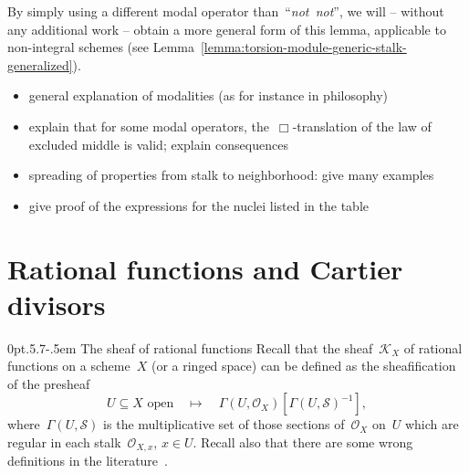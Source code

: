 \documentclass[10pt,reqno,a4paper]{amsbook}
\makeatletter
\theoremstyle{definition}
\theoremstyle{plain}
\theoremstyle{remark}
\renewcommand{\O}{\mathcal{O}}
\newcommand{\K}{\mathcal{K}}
\renewcommand{\S}{\mathcal{S}}
\newcommand{\?}{\,{:}\,}
\renewcommand{\_}{\mathpunct{.}\,}
\newcommand{\notnot}{\emph{not~not}\xspace}
\def\subsection{\@startsection{subsection}{2}%
  {0pt}{.5\linespacing\@plus.7\linespacing}{-.5em}%
  {\normalfont\bfseries}}
\makeatother
\begin{document}
By simply using a different modal operator than~``\notnot'', we will -- without
any additional work -- obtain a more general form of this lemma, applicable to
non-integral schemes (see Lemma~\ref{lemma:torsion-module-generic-stalk-generalized}).

\begin{itemize}
\item general explanation of modalities (as for instance in philosophy)
\item explain that for some modal operators, the~$\Box$-translation of the law
of excluded middle is valid; explain consequences
\item spreading of properties from stalk to neighborhood: give many examples
\item give proof of the expressions for the nuclei listed in the table
\end{itemize}


\section{Rational functions and Cartier divisors}
\label{sect:rational-functions}

\subsection{The sheaf of rational functions} Recall that the sheaf~$\K_X$ of rational
functions on a scheme~$X$ (or a ringed space) can be defined as the sheafification
of the presheaf
\[ \text{$U \subseteq X$ open} \quad\longmapsto\quad \Gamma(U,\O_X)[\Gamma(U,\S)^{-1}], \]
where~$\Gamma(U,\S)$ is the multiplicative set of those sections of~$\O_X$ on~$U$
which are regular in each stalk~$\O_{X,x}$, $x \in U$. Recall also that there are
some wrong definitions in the literature~\cite{kleiman:misconceptions}.
\end{document}
